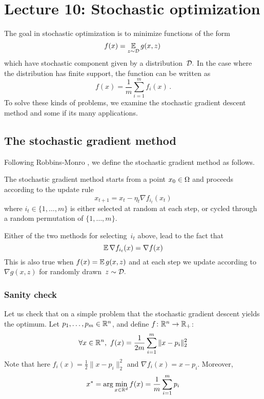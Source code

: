\section{Lecture 10: Stochastic optimization}
The goal in stochastic optimization is to 
minimize functions of the form
\[
    f(x) = \operatorname*{\mathbb{E}}_{z\sim {\cal D}}g(x,z)\,
\]
which have stochastic component given by a distribution~${\cal D}.$ In the case where
the distribution has finite support, the function can be written as
\[
    f(x) = \frac{1}{m}\sum_{i=1}^m f_i(x)\,.
\]
To solve these kinds of problems, we examine the stochastic gradient descent
method and some if its many applications.

\subsection{The stochastic gradient method}

Following Robbins-Monro \cite{Robbins&Monro:1951}, we define the stochastic
gradient method as follows. 

\begin{definition}
The stochastic gradient method starts from a point $x_0\in\Omega$ and proceeds
according to the update rule
\begin{equation*}
    x_{t+1} = x_t - \eta_t\nabla f_{i_t}(x_t) 
\end{equation*}
where $i_t\in\{1,\dots,m\}$ is either selected at random at each step, or cycled
through a random permutation of $\{1,\dots,m\}$.
\end{definition}

Either of the two methods for selecting~$i_t$ above, lead to the fact that
\[
    \operatorname*{\mathbb{E}}\nabla f_{i_t}(x) = \nabla f(x)
\]
This is also true when $f(x)=\operatorname*{\mathbb{E}} g(x,z)$ and at each step we update according to
$\nabla g(x,z)$ for randomly drawn~$z\sim{\cal D}.$
%
\subsubsection{Sanity check}

Let us check that on a simple problem that the stochastic gradient descent yields the optimum. Let $p_1, \dots, p_m\in \mathbb{R}^n$, and define $f\colon \mathbb{R}^n \rightarrow \mathbb{R}_+$:
\begin{equation*}
    \forall x\in \mathbb{R}^n,\ f(x) = \frac{1}{2m}\sum_{i=1}^m \|x-p_i\|_2^2
\end{equation*}
Note that 
here $f_i(x) = \frac{1}{2}\|x-p_i\|_2^2$ 
and $\nabla f_i(x) = x-p_i.$ 
Moreover,
\begin{equation*}
    x^* = \arg\min_{x\in\mathbb{R}^d} f(x) = \frac{1}{m}\sum_{i=1}^mp_i
\end{equation*}

